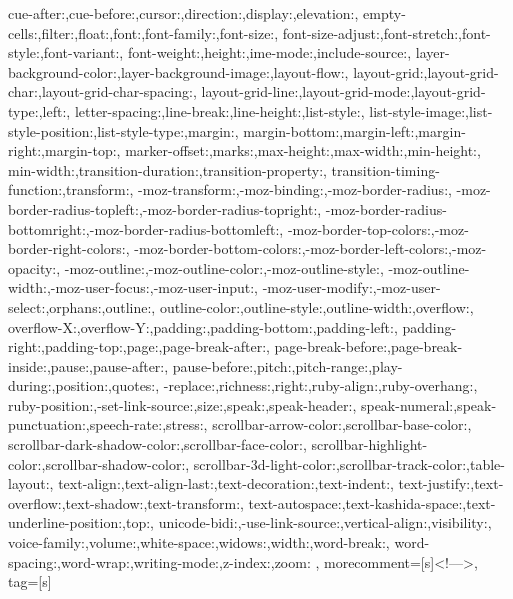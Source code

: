 {{    cue-after:,cue-before:,cursor:,direction:,display:,elevation:,
    empty-cells:,filter:,float:,font:,font-family:,font-size:,
    font-size-adjust:,font-stretch:,font-style:,font-variant:,
    font-weight:,height:,ime-mode:,include-source:,
    layer-background-color:,layer-background-image:,layout-flow:,
    layout-grid:,layout-grid-char:,layout-grid-char-spacing:,
    layout-grid-line:,layout-grid-mode:,layout-grid-type:,left:,
    letter-spacing:,line-break:,line-height:,list-style:,
    list-style-image:,list-style-position:,list-style-type:,margin:,
    margin-bottom:,margin-left:,margin-right:,margin-top:,
    marker-offset:,marks:,max-height:,max-width:,min-height:,
    min-width:,transition-duration:,transition-property:,
    transition-timing-function:,transform:,
    -moz-transform:,-moz-binding:,-moz-border-radius:,
    -moz-border-radius-topleft:,-moz-border-radius-topright:,
    -moz-border-radius-bottomright:,-moz-border-radius-bottomleft:,
    -moz-border-top-colors:,-moz-border-right-colors:,
    -moz-border-bottom-colors:,-moz-border-left-colors:,-moz-opacity:,
    -moz-outline:,-moz-outline-color:,-moz-outline-style:,
    -moz-outline-width:,-moz-user-focus:,-moz-user-input:,
    -moz-user-modify:,-moz-user-select:,orphans:,outline:,
    outline-color:,outline-style:,outline-width:,overflow:,
    overflow-X:,overflow-Y:,padding:,padding-bottom:,padding-left:,
    padding-right:,padding-top:,page:,page-break-after:,
    page-break-before:,page-break-inside:,pause:,pause-after:,
    pause-before:,pitch:,pitch-range:,play-during:,position:,quotes:,
    -replace:,richness:,right:,ruby-align:,ruby-overhang:,
    ruby-position:,-set-link-source:,size:,speak:,speak-header:,
    speak-numeral:,speak-punctuation:,speech-rate:,stress:,
    scrollbar-arrow-color:,scrollbar-base-color:,
    scrollbar-dark-shadow-color:,scrollbar-face-color:,
    scrollbar-highlight-color:,scrollbar-shadow-color:,
    scrollbar-3d-light-color:,scrollbar-track-color:,table-layout:,
    text-align:,text-align-last:,text-decoration:,text-indent:,
    text-justify:,text-overflow:,text-shadow:,text-transform:,
    text-autospace:,text-kashida-space:,text-underline-position:,top:,
    unicode-bidi:,-use-link-source:,vertical-align:,visibility:,
    voice-family:,volume:,white-space:,widows:,width:,word-break:,
    word-spacing:,word-wrap:,writing-mode:,z-index:,zoom:
    },  
    morecomment=[s]{<!--}{-->},
    tag=[s]
}
